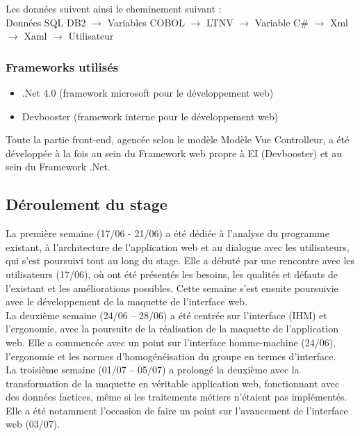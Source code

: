 \documentclass[a4paper,french,8pt]{article}
\begin{document}
			Les données suivent ainsi le cheminement suivant : \\

			 Données SQL DB2 $\to$ Variables COBOL $\to$ LTNV $\to$ Variable C\# $\to$ Xml $\to$ Xaml $\to$ Utilisateur 


	
		\subsubsection{Frameworks utilisés}
		
			\begin{itemize}
				\item .Net 4.0 (framework microsoft pour le développement web)
				\item Devbooster (framework interne pour le développement web)
			\end{itemize}
			
			Toute la partie front-end, agencée selon le modèle Modèle Vue Controlleur, a été développée à la fois au sein du Framework  web propre à EI (Devbooster) et au sein du Framework .Net.
		
		
	\subsection{Déroulement du stage}
	
		La première semaine (17/06 - 21/06) a été dédiée à l’analyse du programme existant, à l’architecture de l’application web et au dialogue avec les utilisateurs,
		qui s’est poursuivi tout au long du stage. Elle a débuté par une rencontre avec les utilisateurs (17/06), où ont été présentés les besoins, les qualités et défauts de l’existant et les améliorations possibles. 
		Cette semaine s’est ensuite poursuivie avec le développement de la maquette de l'interface web. \\ 
		
		La deuxième semaine (24/06 – 28/06) a été centrée sur l’interface (IHM) et l’ergonomie, avec la poursuite de la réalisation de la maquette de l’application web.
		Elle a commencée avec un point sur l’interface homme-machine (24/06), l’ergonomie et les normes d’homogénéisation du groupe en termes d’interface.\\ 
		
		La troisième semaine (01/07 – 05/07) a prolongé la deuxième avec la transformation de la maquette en véritable application web, fonctionnant avec des données factices, 
		même si les traitements métiers n'étaient pas implémentés.
		Elle a été notamment l’occasion de faire un point sur l’avancement de l’interface web (03/07).\\ 
\end{document}
